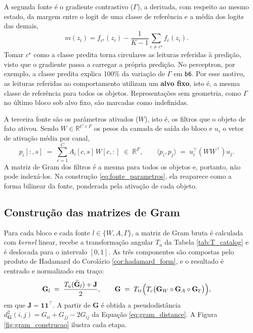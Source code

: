 A segunda fonte é o gradiente contrastivo ($\Gamma$), a derivada, com respeito ao mesmo estado, da margem entre o logit de uma classe de referência e a média dos logits das demais,
\begin{equation}\label{eq:margem}
    m(z_i) = f_{c^\star}(z_i) - \frac{1}{K-1}\sum_{c \neq c^\star} f_c(z_i).
\end{equation}
Tomar $c^\star$ como a classe predita torna circulares as leituras referidas à predição, visto que o gradiente passa a carregar a própria predição. No perceptron, por exemplo, a classe predita explica 100\% da variação de $\Gamma$ em \texttt{b6}. Por esse motivo, as leituras referidas ao comportamento utilizam um \textbf{alvo fixo}, isto é, a mesma classe de referência para todos os objetos. Representações sem geometria, como $\Gamma$ no último bloco sob alvo fixo, são marcadas como indefinidas.

A terceira fonte são os parâmetros ativados ($W$), isto é, os filtros que o objeto de fato ativou. Sendo $W \in \mathbb{R}^{C \times F}$ os pesos da camada de saída do bloco e $u_i$ o vetor de ativação média por canal,
\begin{equation}\label{eq:fonte_parametros}
    p_i[:,s] \;=\; \sum_{c=1}^{C} A_i[c,s]\, W[c,:] \;\in\; \mathbb{R}^{F},
    \qquad
    \langle p_i, p_j\rangle \;=\; u_i^\top (WW^\top) u_j .
\end{equation}
A matriz de Gram dos filtros é a mesma para todos os objetos e, portanto, não pode indexá-los. Na construção \eqref{eq:fonte_parametros}, ela reaparece como a forma bilinear da fonte, ponderada pela ativação de cada objeto.

\subsection{Construção das matrizes de Gram}\label{subsec:construcao}

Para cada bloco e cada fonte $l \in \{W, A, \Gamma\}$, a matriz de Gram bruta é calculada com \textit{kernel} linear, recebe a transformação angular $T_a$ da Tabela \ref{tab:T_catalog} e é deslocada para o intervalo $[0,1]$. As três componentes são compostas pelo produto de Hadamard do Corolário \ref{cor:hadamard_form}, e o resultado é centrado e normalizado em traço:
\begin{equation}\label{eq:componente}
    \mathbf{G}_l \;=\; \frac{T_a(\widetilde{\mathbf{G}}_l) + \mathbf{J}}{2},
    \qquad
    \mathbf{G} \;=\; T_{\mathrm{tr}}\Bigl(T_c\bigl(\mathbf{G}_W \circ \mathbf{G}_A \circ
    \mathbf{G}_\Gamma\bigr)\Bigr),
\end{equation}
em que $\mathbf{J} = \mathbf{1}\mathbf{1}^\top$. A partir de $\mathbf{G}$ é obtida a pseudodistância $d_{\mathbf{G}}^2(i,j) = G_{ii} + G_{jj} - 2G_{ij}$ da Equação \eqref{eq:gram_distance}. A Figura \ref{fig:gram_construcao} ilustra cada etapa.

